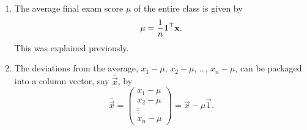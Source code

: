 \documentclass{ximera}
\begin{document}
\begin{example}
  \begin{enumerate}
  \item The average final exam score $\mu$ of the entire class is given
    by
    \begin{equation*}
      \mu = \frac{1}{n} \mathbf{1}^\top \mathbf{x}.
    \end{equation*}
    This was explained previously.
  \item The deviations from the average, $x_1 - \mu$, $x_2 - \mu$, \ldots, $x_n
    - \mu$, can be packaged into a column vector, say $\overline{\vec{x}}$,
    by
    \begin{equation*}
      \overline{\vec{x}} =
      \begin{pmatrix}
        x_1 - \mu \\ x_2 - \mu \\ \vdots \\ x_n - \mu
      \end{pmatrix}
      = \vec{x} - \mu \vec{1}.
    \end{equation*}

\end{enumerate}
\end{example}
\end{document}

